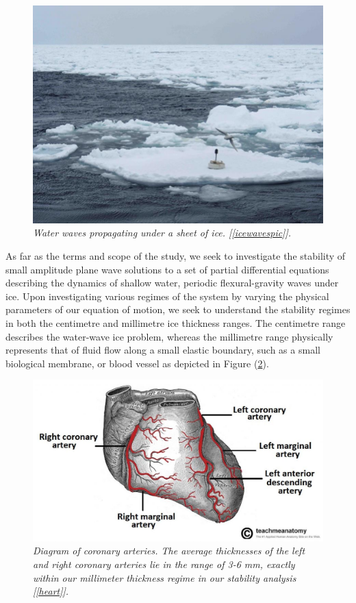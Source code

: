 \documentclass{article}
\begin{document}
\begin{figure}[hbt!] 
\centering
\includegraphics[scale = .4]{icewaves.jpg}
\caption{ \emph{Water waves propagating under a sheet of ice. [\ref{icewavespic}].}}\label{icewaves}
\end{figure}


 As far as the terms and scope of the study, we seek to investigate the stability of small amplitude plane wave solutions to a set of partial differential equations describing the dynamics of shallow water, periodic flexural-gravity waves under ice. Upon investigating various regimes of the system by varying the physical parameters of our equation of motion, we seek to understand the stability regimes in both the centimetre and millimetre ice thickness ranges. The centimetre range describes the water-wave ice problem, whereas the millimetre range physically represents that of fluid flow along a small elastic boundary, such as a small biological membrane, or blood vessel as depicted in Figure (\ref{bloodvessel}).  \\
 
\begin{figure}[hbt!]
\centering
\includegraphics[scale = .45]{bloodvessel.jpg}
\caption{ \emph{Diagram of coronary arteries. The average thicknesses of the left and right coronary arteries lie in the range of 3-6 mm, exactly within our millimeter thickness regime in our stability analysis [\ref{heart}]. }}  \label{bloodvessel}
\end{figure}
 
\end{document}
